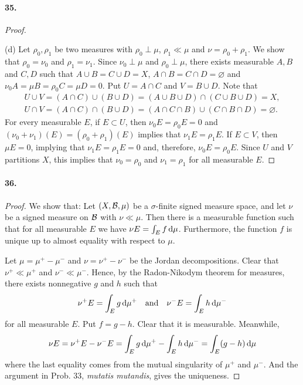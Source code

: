   \paragraph{35.}
  \begin{proof}
    $\,$\par
    (d) Let $\rho_0,\rho_1$ be two measures with $\rho_0\perp\mu$, $\rho_1\ll
    \mu$ and $\nu=\rho_0+\rho_1$. We show that $\rho_0=\nu_0$ and $\rho_1
    =\nu_1$. Since $\nu_0\perp\mu$ and $\rho_0\perp\mu$, there exists measurable
    $A,B$ and $C,D$ such that $A\cup B=C\cup D=X$, $A\cap B=C\cap D=\varnothing$
    and $\nu_0A=\mu B=\rho_0C=\mu D=0$. Put $U=A\cap C$ and $V=B\cup D$. Note
    that
    \begin{align*}
      U\cup V=(A\cap C)\cup(B\cup D)=(A\cup B\cup D)\cap(C\cup B\cup D)=X,\\
      U\cap V=(A\cap C)\cap(B\cup D)=(A\cap C\cap B)\cup(C\cap B\cap D)=
      \varnothing.
    \end{align*}
    For every measurable $E$, if $E\subset U$, then $\nu_0E=\rho_0E=0$ and
    $(\nu_0+\nu_1)(E)=(\rho_0+\rho_1)(E)$ implies that $\nu_1 E=\rho_1 E$. 
    If $E\subset V$, then $\mu E=0$, implying that $\nu_1E=\rho_1E=0$ and,
    therefore, $\nu_0E=\rho_0E$. Since $U$ and $V$ partitions $X$, this implies
    that $\nu_0=\rho_0$ and $\nu_1=\rho_1$ for all measurable $E$. 
  \end{proof}
  
  \paragraph{36.}
  \begin{proof}
    We show that: Let $(X,\mathcal{B},\mu)$ be a $\sigma$-finite signed measure
    space, and let $\nu$ be a signed measure on $\mathcal{B}$ with $\nu\ll\mu$.
    Then there is a measurable function such that for all measurable $E$ we have
    $\nu E=\int_E f\,\mathrm{d}\mu$. Furthermore, the function $f$ is unique up to 
    almost equality with respect to $\mu$.\par
    Let $\mu=\mu^+-\mu^-$ and $\nu=\nu^+-\nu^-$ be the Jordan decompositions.
    Clear that $\nu^+\ll\mu^+$ and $\nu^-\ll\mu^-$. Hence, by the Radon-Nikodym
    theorem for measures, there exists nonnegative $g$ and $h$ such that
    \[
      \nu^+E=\int_E g\,\mathrm{d}\mu^+
      \quad\text{and}\quad
      \nu^-E=\int_E h\,\mathrm{d}\mu^-
    \]
    for all measurable $E$. Put $f=g-h$. Clear that it is measurable. Meanwhile,
    \[
      \nu E=\nu^+E-\nu^-E=
      \int_E g\,\mathrm{d}\mu^+-\int_E h\,\mathrm{d}\mu^-=
      \int_E (g-h)\,\mathrm{d}\mu
    \]
    where the last equality comes from the mutual singularity of $\mu^+$ and
    $\mu^-$. And the argument in Prob. 33, \textit{mutatis mutandis}, gives the
    uniqueness.
  \end{proof}
  
